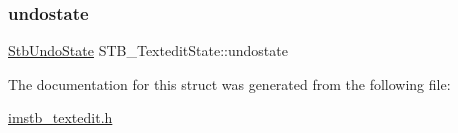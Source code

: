 \mbox{\label{struct_s_t_b___textedit_state_a7e1f0366bbd57e01a4f49a720beb9ead}} 
\subsubsection{\texorpdfstring{undostate}{undostate}}
{\footnotesize\ttfamily \mbox{\hyperlink{struct_stb_undo_state}{Stb\+Undo\+State}} S\+T\+B\+\_\+\+Textedit\+State\+::undostate}



The documentation for this struct was generated from the following file\+:\begin{DoxyCompactItemize}
\item 
\mbox{\hyperlink{imstb__textedit_8h}{imstb\+\_\+textedit.\+h}}\end{DoxyCompactItemize}
